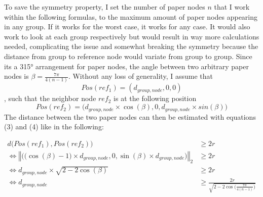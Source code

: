\documentclass[12pt,a4paper,oneside,american,parskip=half]{article}
\begin{document}
\begin{justify}
\begin{normalsize}
\newline
To save the symmetry property, I set the number of paper nodes $n$ that I work within the following formulas, to the maximum amount of paper nodes appearing in any group. If it works for the worst case, it works for any case. It would also work to look at each group respectively but would result in way more calculations needed, complicating the issue and somewhat breaking the symmetry because the distance from group to reference node would variate from group to group.
Since its a 315° arrangement for paper nodes, the angle between two arbitrary paper nodes is $\beta = \frac{7\pi}{4(n - 1)}$. Without any loss of generality, I assume that 
\begin{equation}
Pos(ref_1) = (d_{group, node}, 0, 0)
\end{equation}
, such that the neighbor node $ref_2$ is at the following position
\begin{equation}
Pos(ref_2) = \big(d_{group, node} \times \cos(\beta), 0, d_{group, node} \times sin(\beta) \big)
\end{equation}
The distance between the two paper nodes can then be estimated with equations (3) and (4) like in the following:

\begin{align*}
d\big(Pos(ref_1), Pos(ref_2)\big) &\ge 2r \\
\Leftrightarrow \left\Vert \Big(\big(\cos(\beta) - 1 \big) \times d_{group, node} , 0, \sin(\beta) \times d_{group, node} \Big) \right\Vert_{2} &\ge 2r \\
\Leftrightarrow d_{group, node} \times \sqrt{2 - 2 \cos(\beta)} &\ge 2r \\
\Leftrightarrow d_{group, node} &\ge \frac{2r}{\sqrt{2 - 2\cos\big(\frac{7\pi}{4(n - 1)}\big)}}
\end{align*}


\end{normalsize}
\end{justify}
\end{document}
